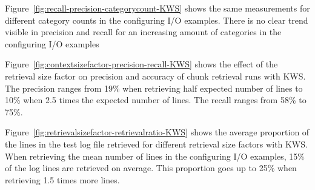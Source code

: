 \documentclass[\myrootdir/main.tex]{subfiles}
\begin{document}
Figure~\ref{fig:recall-precision-categorycount-KWS} shows the same measurements for different category counts in the configuring I/O examples.
There is no clear trend visible in precision and recall for an increasing amount of categories in the configuring I/O examples

Figure~\ref{fig:contextsizefactor-precision-recall-KWS} shows the effect of the retrieval size factor on precision and accuracy of chunk retrieval runs with KWS\@.
The precision ranges from 19\% when retrieving half expected number of lines to 10\% when 2.5 times the expected number of lines.
The recall ranges from 58\% to 75\%.

Figure~\ref{fig:retrievalsizefactor-retrievalratio-KWS} shows the average proportion of the lines in the test log file retrieved for different retrieval size factors with KWS\@.
When retrieving the mean number of lines in the configuring I/O examples, 15\% of the log lines are retrieved on average.
This proportion goes up to 25\% when retrieving 1.5 times more lines.
\end{document}
